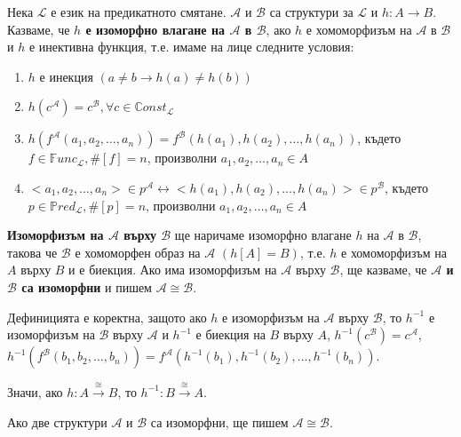 \documentclass{article}
\begin{document}
\begin{mydef}
Нека $\mathcal{L}$ е език на предикатното смятане. $\mathcal{A}$ и $\mathcal{B}$ са структури за $\mathcal{L}$ и $h: A \longrightarrow B$. 
Казваме, че \textbf{$h$ е изоморфно влагане на $\mathcal{A}$ в $\mathcal{B}$}, ако $h$ е хомоморфизъм на $\mathcal{A}$ в $\mathcal{B}$ и $h$ е инективна функция, т.е. имаме на лице следните условия:
\begin{enumerate}
\item $h$ е инекция $(a \neq b \longrightarrow h(a) \neq h(b))$
\item $h(c^\mathcal{A}) = c^\mathcal{B}, \forall c \in \mathbb{C}onst_\mathcal{L}$
\item $h(f^\mathcal{A}(a_1, a_2, \ldots, a_n)) = f^\mathcal{B}(h(a_1), h(a_2), \ldots, h(a_n))$, където $f \in \mathbb{F}unc_\mathcal{L}, \#[f] = n$,  произволни $a_1, a_2, \ldots, a_n \in A$
\item $<a_1, a_2, \ldots, a_n> \in p^\mathcal{A} \longleftrightarrow <h(a_1), h(a_2), \ldots, h(a_n)> \in p^\mathcal{B}$, където $p \in \mathbb{P}red_\mathcal{L}, \#[p] = n$, произволни $a_1, a_2, \ldots, a_n \in A$
\end{enumerate}


\end{mydef}


\begin{mydef}[Изоморфизъм]
\textbf{Изоморфизъм на $\mathcal{A}$ върху $\mathcal{B}$} ще наричаме изоморфно влагане $h$ на $\mathcal{A}$ в $\mathcal{B}$, такова че $\mathcal{B}$ е хомоморфен образ на $\mathcal{A}$ $(h[A] = B)$, т.е. $h$ е хомоморфизъм на $A$ върху $B$ и е  биекция. Ако има изоморфизъм на $\mathcal{A}$ върху $\mathcal{B}$, ще казваме, че \textbf{$\mathcal{A}$ и $\mathcal{B}$ са изоморфни} и пишем $\mathcal{A} \cong \mathcal{B}$.

\begin{remark}
Дефиницията е коректна, защото ако $h$ е изоморфизъм на $\mathcal{A}$ върху $\mathcal{B}$, то $h^{-1}$ е изоморфизъм на $\mathcal{B}$ върху $\mathcal{A}$ и $h^{-1}$ е биекция на $B$ върху $A$, $h^{-1}(c^\mathcal{B}) = c^\mathcal{A}$, $h^{-1}(f^\mathcal{B}(b_1, b_2, \ldots, b_n)) = f^\mathcal{A}(h^{-1}(b_1), h^{-1}(b_2), \ldots, h^{-1}(b_n))$. 

Значи, ако $h: A \overset{\cong}{\longrightarrow} B$, то $h^{-1}: B \overset{\cong}{\longrightarrow} A$.

Ако две структури $\mathcal{A}$ и $\mathcal{B}$ са изоморфни, ще пишем $\mathcal{A} \cong \mathcal{B}$.
\end{remark}

\end{mydef}
\end{document}
